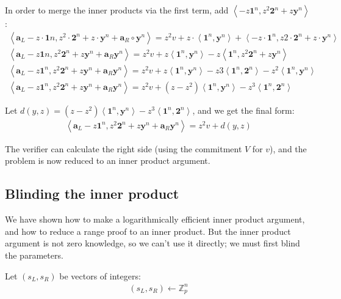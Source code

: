 \documentclass{article}
\begin{document}
In order to merge the inner products via the first term, add $\left<-z \textbf{1}^n, z^2 \textbf{2}^n + z \textbf{y}^n\right>$:
\begin{align}
  \left<\textbf{a}_L - z \cdot \textbf{1}n, z^2 \cdot \textbf{2}^n + z \cdot \textbf{y}^n + \textbf{a}_R \circ \textbf{y}^n\right> = z^2 v + z \cdot \left<\textbf{1}^n, \textbf{y}^n\right> + \left<-z \cdot \textbf{1}^n, z2 \cdot \textbf{2}^n + z \cdot \textbf{y}^n\right>\\
  \left<\textbf{a}_L - z \textbf{1}n, z^2 \textbf{2}^n + z \textbf{y}^n + \textbf{a}_R \textbf{y}^n\right> = z^2 v + z \left<\textbf{1}^n, \textbf{y}^n\right> - z \left<\textbf{1}^n, z^2 \textbf{2}^n + z \textbf{y}^n\right>\\
  \left<\textbf{a}_L - z \textbf{1}^n, z^2 \textbf{2}^n + z \textbf{y}^n + \textbf{a}_R \textbf{y}^n\right> = z^2 v + z \left<\textbf{1}^n, \textbf{y}^n\right> - z3 \left<\textbf{1}^n, \textbf{2}^n\right> - z^2 \left<\textbf{1}^n, \textbf{y}^n\right>\\
  \left<\textbf{a}_L - z \textbf{1}^n, z^2 \textbf{2}^n + z \textbf{y}^n + \textbf{a}_R \textbf{y}^n\right> = z^2 v + (z - z^2) \left<\textbf{1}^n, \textbf{y}^n\right> - z^3 \left<\textbf{1}^n, \textbf{2}^n\right>
\end{align}
  
Let $d(y,z) = (z - z^2) \left<\textbf{1}^n, \textbf{y}^n\right> - z^3 \left<\textbf{1}^n, \textbf{2}^n\right>$, and we get the final form:
\begin{align}
  \left<\textbf{a}_L - z \textbf{1}^n, z^2 \textbf{2}^n + z \textbf{y}^n + \textbf{a}_R \textbf{y}^n\right> = z^2 v + d(y,z)
\end{align}

The verifier can calculate the right side (using the commitment $V$ for $v$), and the problem is now reduced to an inner product argument.


\subsection{Blinding the inner product}

We have shown how to make a logarithmically efficient inner product argument, and how to reduce a range proof to an inner product.  But the inner product argument is not zero knowledge, so we can't use it directly; we must first blind the parameters.

Let $(s_L, s_R)$ be vectors of integers:
\begin{align}
  (s_L, s_R) \leftarrow \mathbb{Z}_p^n
\end{align}
\end{document}
